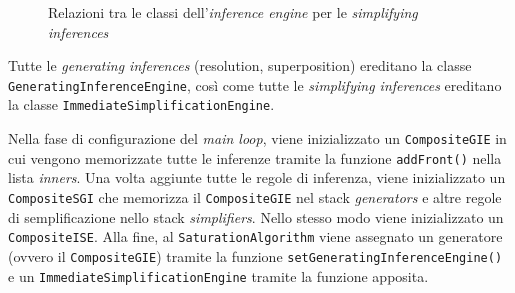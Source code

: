 \begin{figure}[H]
    \centering
    \caption{Relazioni tra le classi dell'\emph{inference engine} per le \emph{simplifying inferences}}
    \label{fig:simengineclass}
\end{figure}
\begin{remark}
    Tutte le \emph{generating inferences} (resolution, superposition) ereditano la classe \verb|GeneratingInferenceEngine|,
    così come tutte le \emph{simplifying inferences} ereditano la classe \verb|ImmediateSimplificationEngine|.
\end{remark}
Nella fase di configurazione del \emph{main loop}, viene inizializzato un \verb|CompositeGIE| in cui 
vengono memorizzate tutte le inferenze tramite la funzione \verb|addFront()| nella lista \emph{inners}.
Una volta aggiunte tutte le regole di inferenza, viene inizializzato un \verb|CompositeSGI| che memorizza
il \verb|CompositeGIE| nel stack \emph{generators} e altre regole di semplificazione nello stack \emph{simplifiers}.
Nello stesso modo viene inizializzato un \verb|CompositeISE|.
Alla fine, al \verb|SaturationAlgorithm| viene assegnato un generatore (ovvero il \verb|CompositeGIE|)
tramite la funzione \verb|setGeneratingInferenceEngine()| e un \verb|ImmediateSimplificationEngine| tramite la funzione 
apposita. 
